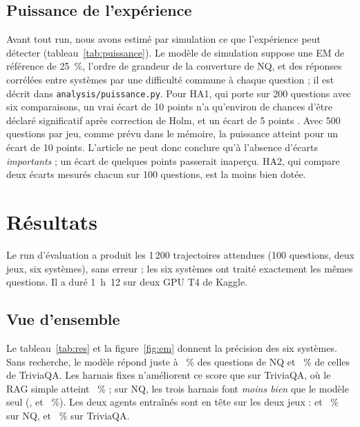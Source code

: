 \subsection{Puissance de l'expérience}
Avant tout run, nous avons estimé par simulation ce que l'expérience peut détecter (tableau~\ref{tab:puissance}). Le modèle de simulation suppose une EM de référence de 25~\%, l'ordre de grandeur de la couverture de NQ, et des réponses corrélées entre systèmes par une difficulté commune à chaque question ; il est décrit dans \texttt{analysis/puissance.py}. Pour HA1, qui porte sur 200 questions avec six comparaisons, un vrai écart de 10 points n'a qu'environ  de chances d'être déclaré significatif après correction de Holm, et un écart de 5 points . Avec 500 questions par jeu, comme prévu dans le mémoire, la puissance atteint  pour un écart de 10 points. L'article ne peut donc conclure qu'à l'absence d'écarts \emph{importants} ; un écart de quelques points passerait inaperçu. HA2, qui compare deux écarts mesurés chacun sur 100 questions, est la moins bien dotée.

\begin{table}[ht]
\centering\small

\caption{Puissance du test de McNemar apparié selon le nombre de questions et l'écart réel d'EM entre deux systèmes : part de 1\,000 simulations où l'écart est déclaré significatif, au seuil de 5~\% et au seuil le plus strict de la correction de Holm pour six comparaisons (5~\%/6). EM de référence : 25~\%. Ce tableau ne dépend d'aucune donnée observée.}
\label{tab:puissance}
\end{table}

\FloatBarrier
\section{Résultats}\label{sec:resultats}


Le run d'évaluation a produit les 1\,200 trajectoires attendues (100 questions, deux jeux, six systèmes), sans erreur ; les six systèmes ont traité exactement les mêmes questions. Il a duré 1~h~12 sur deux GPU T4 de Kaggle.

\subsection{Vue d'ensemble}
Le tableau~\ref{tab:res} et la figure~\ref{fig:em} donnent la précision des six systèmes. Sans recherche, le modèle répond juste à ~\% des questions de NQ et ~\% de celles de TriviaQA. Les harnais fixes n'améliorent ce score que sur TriviaQA, où le RAG simple atteint ~\% ; sur NQ, les trois harnais font \emph{moins bien} que le modèle seul (,  et ~\%). Les deux agents entraînés sont en tête sur les deux jeux :  et ~\% sur NQ,  et ~\% sur TriviaQA.

